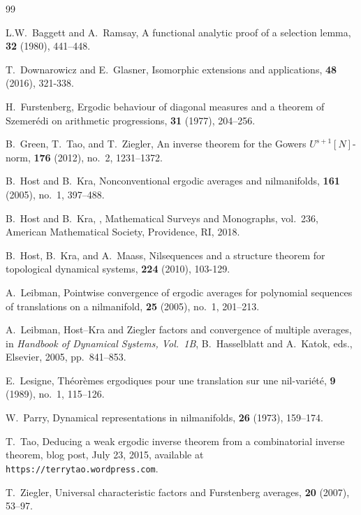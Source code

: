\documentclass[12pt]{amsart}
\theoremstyle{plain}
\theoremstyle{definition}
\begin{document}
\begin{thebibliography}{99}


L.W.~Baggett and A.~Ramsay, 
\newblock A functional analytic proof of a selection lemma,
 {\bf 32} (1980), 441--448.

T.~Downarowicz and E.~Glasner, 
\newblock Isomorphic extensions and applications,
 {\bf 48} (2016), 321-338. 

H.~Furstenberg,
\newblock Ergodic behaviour of diagonal measures and a theorem of Szemer\'edi on arithmetic progressions,
 {\bf 31} (1977), 204--256.

B.~Green, T.~Tao, and T.~Ziegler,
\newblock An inverse theorem for the Gowers {$U^{s+1}[N]$}-norm,
 {\bf 176} (2012), no.~2, 1231--1372.

B.~Host and B.~Kra,
\newblock Nonconventional ergodic averages and nilmanifolds,
 {\bf 161} (2005), no.~1, 397--488.

B.~Host and B.~Kra,
,
\newblock Mathematical Surveys and Monographs, vol.~236, American Mathematical Society, Providence, RI, 2018.


B.~Host, B.~Kra, and A.~Maass,
\newblock Nilsequences and a structure theorem for topological dynamical systems,
 {\bf 224} (2010), 103-129. 


A.~Leibman,
\newblock Pointwise convergence of ergodic averages for polynomial sequences of translations on a nilmanifold,
 {\bf 25} (2005), no.~1, 201--213.

A.~Leibman,
\newblock Host--Kra and Ziegler factors and convergence of multiple averages,
\newblock in {\em Handbook of Dynamical Systems, Vol.~1B},
B.~Hasselblatt and A.~Katok, eds.,
Elsevier, 2005, pp.~841--853.

E.~Lesigne,
\newblock Th\'eor\`emes ergodiques pour une translation sur une nil-vari\'et\'e,
 {\bf 9} (1989), no.~1, 115--126.

W.~Parry,
\newblock Dynamical representations in nilmanifolds,
 {\bf 26} (1973), 159--174.

T.~Tao,
\newblock Deducing a weak ergodic inverse theorem from a combinatorial inverse theorem,
\newblock blog post, July 23, 2015, available at \texttt{https://terrytao.wordpress.com}.

T.~Ziegler,
\newblock Universal characteristic factors and Furstenberg averages,
 {\bf 20} (2007), 53--97.



\end{thebibliography}
\end{document}
